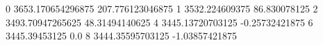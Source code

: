 0 3653.170654296875 207.776123046875
1 3532.224609375 86.830078125
2 3493.70947265625 48.31494140625
4 3445.13720703125 -0.25732421875
6 3445.39453125 0.0
8 3444.35595703125 -1.03857421875
